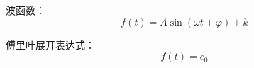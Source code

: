 \documentclass[UTF8]{ctexart}
\begin{document}
波函数：
\[ f(t) = A\sin(\omega t + \varphi) + k \]

傅里叶展开表达式：
\[ f(t) = c_{0} \]
\end{document}
